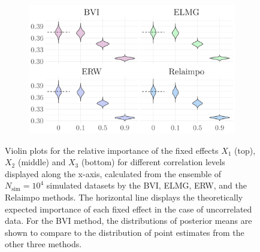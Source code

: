 \begin{figure}[H]
  \begin{subfigure}[b]{0.7\linewidth}
    \centering
    \includegraphics[width=\linewidth]{Figures/ViolinPlots/Variance_V3.png}
    \label{fig:relimp_X3_fig}
  \end{subfigure}
  
  \caption[Relative importance of the fixed effects in Gaussian LMM]{Violin plots for the relative importance of the fixed effects $X_1$ (top), $X_2$ (middle) and $X_3$ (bottom) for different correlation levels displayed along the x-axis, calculated from the ensemble of $N_{\text{sim}}=10^4$ simulated datasets by the BVI, ELMG, ERW, and the Relaimpo methods. The horizontal line displays the theoretically expected importance of each fixed effect in the case of uncorrelated data. For the BVI method, the distributions of posterior means are shown to compare to the distribution of point estimates from the other three methods.}
  \label{fig:relimp_all}
\end{figure}

